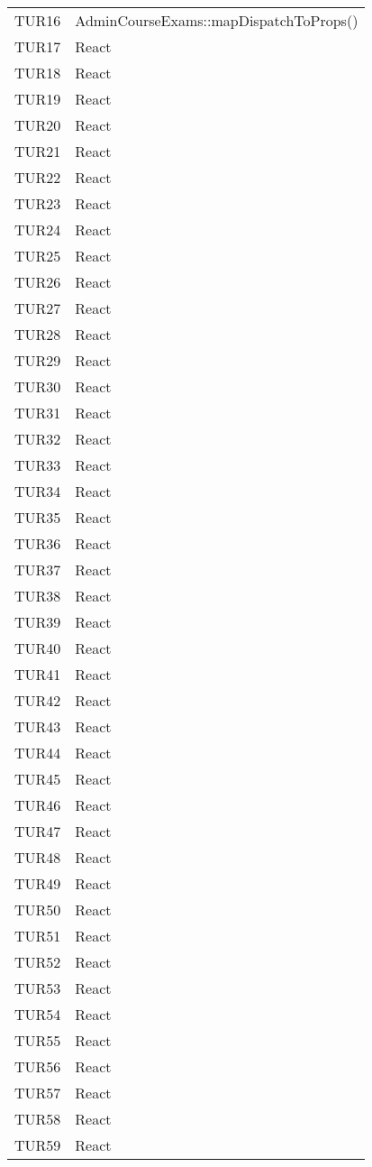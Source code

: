 \documentclass[PianoDiQualifica.tex]{subfiles}
\begin{document}
\begin{longtable}[H]{P{5cm}P{9cm}}
	TUR16 & AdminCourseExams::mapDispatchToProps() \\ 
	TUR17 & React \\ 
	TUR18 & React \\ 
	TUR19 & React \\ 
	TUR20 & React \\ 
	TUR21 & React \\ 
	TUR22 & React \\ 
	TUR23 & React \\ 
	TUR24 & React \\ 
	TUR25 & React \\ 
	TUR26 & React \\ 
	TUR27 & React \\ 
	TUR28 & React \\ 
	TUR29 & React \\ 
	TUR30 & React \\ 
	TUR31 & React \\ 
	TUR32 & React \\ 
	TUR33 & React \\ 
	TUR34 & React \\ 
	TUR35 & React \\ 
	TUR36 & React \\ 
	TUR37 & React \\ 
	TUR38 & React \\ 
	TUR39 & React \\ 
	TUR40 & React \\ 
	TUR41 & React \\ 
	TUR42 & React \\ 
	TUR43 & React \\ 
	TUR44 & React \\ 
	TUR45 & React \\ 
	TUR46 & React \\ 
	TUR47 & React \\ 
	TUR48 & React \\ 
	TUR49 & React \\ 
	TUR50 & React \\ 
	TUR51 & React \\ 
	TUR52 & React \\ 
	TUR53 & React \\ 
	TUR54 & React \\ 
	TUR55 & React \\ 
	TUR56 & React \\ 
	TUR57 & React \\ 
	TUR58 & React \\ 
	TUR59 & React \\ 

\end{longtable}
\end{document}
